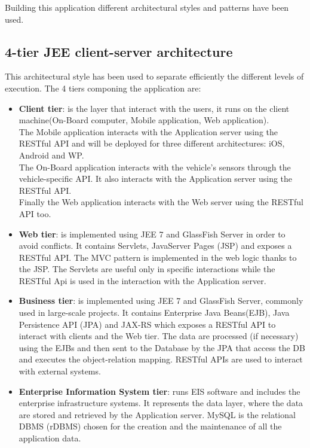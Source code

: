 Building this application different architectural styles and patterns have been used.
\subsection{4-tier JEE client-server architecture}
	This architectural style has been used to separate efficiently the different levels of execution. The 4 tiers componing the application are:
	\begin{itemize}
		\item{\textbf{Client tier}: is the layer that interact with the users, it runs on the client machine(On-Board computer, Mobile application, Web application). 
		\\The Mobile application interacts with the Application server using the RESTful API and will be deployed for three different architectures: iOS, Android and WP.
		\\The On-Board application interacts with the vehicle's sensors through the vehicle-specific API. It also interacts with the Application server using the RESTful API.
		\\Finally the Web application interacts with the Web server using the RESTful API too.}
		\item{\textbf{Web tier}: is implemented using JEE 7 and GlassFish Server in order to avoid conflicts. It contains Servlets, JavaServer Pages (JSP) and exposes a RESTful API. The MVC pattern is implemented in the web logic thanks to the JSP. The Servlets are useful only in specific interactions while the RESTful Api is used in the interaction with the Application server.}
		\item{\textbf{Business tier}: is implemented using JEE 7 and GlassFish Server, commonly used in large-scale projects. It contains Enterprise Java Beans(EJB), Java Persistence API (JPA) and JAX-RS which exposes a RESTful API to interact with clients and the Web tier. The data are processed (if necessary) using the EJBs and then sent to the Database by the JPA that access the DB and executes the object-relation mapping. RESTful APIs are used to interact with external systems.}
		\item{\textbf{Enterprise Information System tier}: runs EIS software and includes the enterprise infrastructure systems. It represents the data layer, where the data are stored and retrieved by the Application server. MySQL is the relational DBMS (rDBMS) chosen for the creation and the maintenance of all the application data.}
	\end{itemize}
